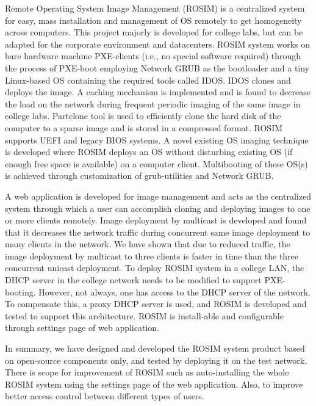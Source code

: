 \documentclass[a4paper,12pt]{article}
\begin{document}
Remote Operating System Image Management (ROSIM) is a centralized system for easy, mass installation and management of OS remotely to get homogeneity across computers. This project majorly is developed for college labs, but can be adapted for the corporate environment and datacenters. ROSIM system works on bare hardware machine PXE-clients (i.e., no special software required) through the process of PXE-boot employing Network GRUB as the bootloader and a tiny Linux-based OS containing the required tools called IDOS.  IDOS clones and deploys the image. A caching mechanism is implemented and is found to decrease the load on the network during frequent periodic imaging of the same image in college labs. Partclone tool is used to efficiently clone the hard disk of the computer to a sparse image and is stored in a compressed format. ROSIM supports UEFI and legacy BIOS systems. A novel existing OS imaging technique is developed where ROSIM deploys an OS without disturbing existing OS (if enough free space is available) on a computer client. Multibooting of these OS(s) is achieved through customization of grub-utilities and Network GRUB.
 
 A web application is developed for image management and acts as the centralized system through which a user can accomplish cloning and deploying images to one or more clients remotely. Image deployment by multicast is developed and found that it decreases the network traffic during concurrent same image deployment to many clients in the network. We have shown that due to reduced traffic, the image deployment by multicast to three clients is faster in time than the three concurrent unicast deployment. To deploy ROSIM system in a college LAN, the DHCP server in the college network needs to be modified to support PXE-booting. However, not always, one has access to the DHCP server of the network. To compensate this, a proxy DHCP server is used, and ROSIM is developed and tested to support this architecture. ROSIM is install-able and configurable through settings page of web application. 
 
 In summary, we have designed and developed the ROSIM system product based on open-source components only, and tested by deploying it on the test network. There is scope for improvement of ROSIM such as auto-installing the whole ROSIM system using the settings page of the web application. Also, to improve better access control between different types of users.

\newpage

\newpage
\end{document}
